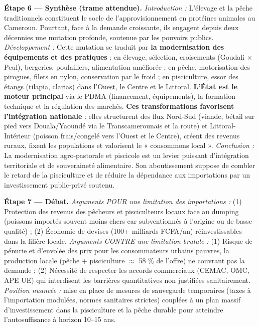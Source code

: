 \documentclass[11pt]{article}
\begin{document}
\begin{exoresolu}
\textbf{Étape 6 — Synthèse (trame attendue).}
\emph{Introduction :} L'élevage et la pêche traditionnels constituent le socle de l'approvisionnement en protéines animales au Cameroun. Pourtant, face à la demande croissante, ils engagent depuis deux décennies une mutation profonde, soutenue par les pouvoirs publics.
\emph{Développement :} Cette mutation se traduit par \textbf{la modernisation des équipements et des pratiques} : en élevage, sélection, croisements (Goudali $\times$ Peul), bergeries, poulaillers, alimentation améliorée ; en pêche, motorisation des pirogues, filets en nylon, conservation par le froid ; en pisciculture, essor des étangs (tilapia, clarias) dans l'Ouest, le Centre et le Littoral. \textbf{L'État est le moteur principal} via le PDMA (financement, équipements), la formation technique et la régulation des marchés. \textbf{Ces transformations favorisent l'intégration nationale} : elles structurent des flux Nord-Sud (viande, bétail sur pied vers Douala/Yaoundé via le Transcamerounais et la route) et Littoral-Intérieur (poisson frais/congelé vers l'Ouest et le Centre), créent des revenus ruraux, fixent les populations et valorisent le « consommons local ».
\emph{Conclusion :} La modernisation agro-pastorale et piscicole est un levier puissant d'intégration territoriale et de souveraineté alimentaire. Son aboutissement suppose de combler le retard de la pisciculture et de réduire la dépendance aux importations par un investissement public-privé soutenu.

\textbf{Étape 7 — Débat.}
\emph{Arguments POUR une limitation des importations :} (1) Protection des revenus des pêcheurs et pisciculteurs locaux face au dumping (poissons importés souvent moins chers car subventionnés à l'origine ou de basse qualité) ; (2) Économie de devises (100+ milliards FCFA/an) réinvestissables dans la filière locale.
\emph{Arguments CONTRE une limitation brutale :} (1) Risque de pénurie et d'envolée des prix pour les consommateurs urbains pauvres, la production locale (pêche + pisciculture $\approx$ 58 \% de l'offre) ne couvrant pas la demande ; (2) Nécessité de respecter les accords commerciaux (CEMAC, OMC, APE UE) qui interdisent les barrières quantitatives non justifiées sanitairement. \emph{Position nuancée :} mise en place de mesures de sauvegarde temporaires (taxes à l'importation modulées, normes sanitaires strictes) couplées à un plan massif d'investissement dans la pisciculture et la pêche durable pour atteindre l'autosuffisance à horizon 10--15 ans.
\end{exoresolu}
\end{document}
